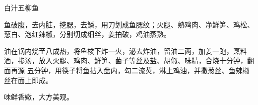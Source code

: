 \begin{recipe}{白汁五柳鱼}

\ingredients


\preparation

\step 鱼破腹，去内脏，挖腮，去鱗，用刀划成鱼腮纹；火腿、熟鸡肉、净鲜笋、鸡松、
葱白、泡红辣椒，分别切成细丝，姜拍破，鸡油蒸熟。

\step 油在锅内烧至八成热，将鱼梭下炸一火，泌去炸油，留油二两，加姜一跑，烹料
酒，掺汤，放入火腿、鸡肉、鲜笋、菌子等丝及盐、胡俶、味精，合烧十分钟，翻面再源
五分钟，用筷子将鱼拈入盘内，勾二流芡，淋上鸡油，并撒葱丝、鱼辣椒丝在面上即成。

\features

味鲜香嫩，大方美观。

\end{recipe}

